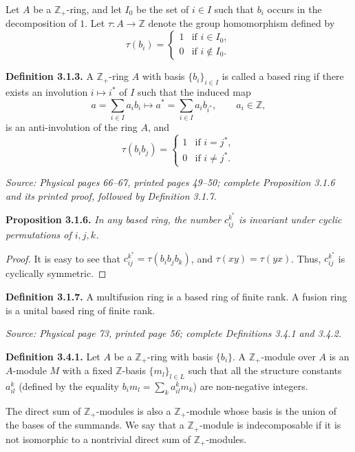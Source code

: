 \documentclass[11pt]{article}
\newcommand{\Z}{\mathbb{Z}}
\newcommand{\Zp}{\mathbb{Z}_+}
\newcommand{\sourceloc}[1]{\par\smallskip\noindent\textit{Source: #1.}\par\nopagebreak[4]\smallskip}
\begin{document}
Let $A$ be a $\Zp$-ring, and let $I_0$ be the set of $i\in I$ such that
$b_i$ occurs in the decomposition of $1$. Let $\tau:A\to\Z$ denote the
group homomorphism defined by
\begin{equation}
\tau(b_i)=\begin{cases}1&\text{if }i\in I_0,\\0&\text{if }i\notin I_0.\end{cases}
\tag{3.1}
\end{equation}

\noindent\textbf{Definition 3.1.3.}
A $\Zp$-ring $A$ with basis $\{b_i\}_{i\in I}$ is called a based ring if
there exists an involution $i\mapsto i^*$ of $I$ such that the induced map
\[
a=\sum_{i\in I}a_i b_i\longmapsto a^*=\sum_{i\in I}a_i b_{i^*},
\qquad a_i\in\Z,
\]
is an anti-involution of the ring $A$, and
\begin{equation}
\tau(b_i b_j)=\begin{cases}1&\text{if }i=j^*,\\0&\text{if }i\ne j^*.\end{cases}
\tag{3.2}
\end{equation}

\sourceloc{Physical pages 66--67, printed pages 49--50; complete Proposition 3.1.6 and its printed proof, followed by Definition 3.1.7}
\noindent\textbf{Proposition 3.1.6.}
\emph{In any based ring, the number $c^{k^*}_{ij}$ is invariant under
cyclic permutations of $i,j,k$.}
\begin{proof}
It is easy to see that $c^{k^*}_{ij}=\tau(b_i b_j b_k)$, and
$\tau(xy)=\tau(yx)$. Thus, $c^{k^*}_{ij}$ is cyclically symmetric.
\end{proof}

\noindent\textbf{Definition 3.1.7.}
A multifusion ring is a based ring of finite rank. A fusion ring is a
unital based ring of finite rank.

\sourceloc{Physical page 73, printed page 56; complete Definitions 3.4.1 and 3.4.2}
\noindent\textbf{Definition 3.4.1.}
Let $A$ be a $\Zp$-ring with basis $\{b_i\}$. A $\Zp$-module over $A$ is
an $A$-module $M$ with a fixed $\Z$-basis $\{m_l\}_{l\in L}$ such that all
the structure constants $a^k_{il}$ (defined by the equality
$b_i m_l=\sum_k a^k_{il}m_k$) are non-negative integers.

The direct sum of $\Zp$-modules is also a $\Zp$-module whose basis is the
union of the bases of the summands. We say that a $\Zp$-module is
indecomposable if it is not isomorphic to a nontrivial direct sum of
$\Zp$-modules.
\end{document}
